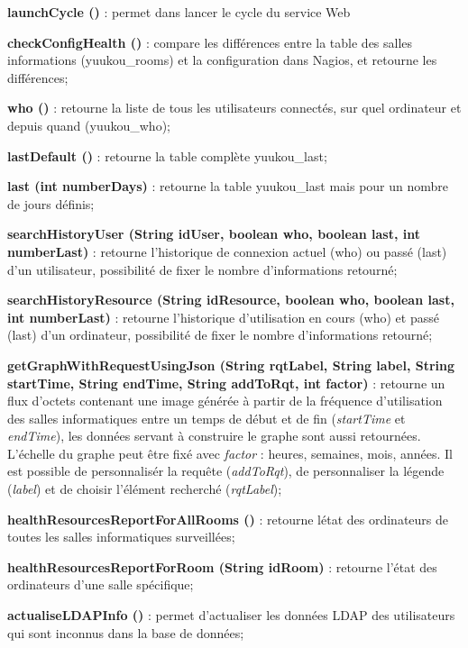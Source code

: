 \noindent\textbf{launchCycle ()} : permet dans lancer le cycle du service Web

\noindent\textbf{checkConfigHealth ()} : compare les diff\'erences entre la table des salles informations (\textsf{yuukou\_rooms}) et la configuration dans Nagios, et retourne les diff\'erences;

\noindent\textbf{who ()} : retourne la liste de tous les utilisateurs connect\'es, sur quel ordinateur et depuis quand (\textsf{yuukou\_who});

\noindent\textbf{lastDefault ()} : retourne la table compl\`ete \textsf{yuukou\_last};

\noindent\textbf{last (int numberDays)} : retourne la table \textsf{yuukou\_last} mais pour un nombre de jours d\'efinis;

\noindent\textbf{searchHistoryUser (String idUser, boolean who, boolean last, int numberLast)} : retourne l'historique de connexion actuel (who) ou pass\'e (last) d'un utilisateur, possibilit\'e de fixer le nombre d'informations retourn\'e;

\noindent\textbf{searchHistoryResource (String idResource, boolean who, boolean last, int numberLast)} : retourne l'historique d'utilisation en cours (who) et pass\'e (last) d'un ordinateur, possibilit\'e de fixer le nombre d'informations retourn\'e;

\noindent\textbf{getGraphWithRequestUsingJson (String rqtLabel, String label, String startTime, String endTime, String addToRqt, int factor)} : retourne un flux d'octets contenant une image g\'en\'er\'ee \`a partir de la fr\'equence d'utilisation des salles informatiques entre un temps de d\'ebut et de fin (\textit{startTime} et \textit{endTime}), les donn\'ees servant \`a construire le graphe sont aussi retourn\'ees. L'\'echelle du graphe peut \^etre fix\'e avec \textit{factor} : heures, semaines, mois, ann\'ees.
Il est possible de personnalis\'er la requ\^ete (\textit{addToRqt}), de personnaliser la l\'egende (\textit{label}) et de choisir l'\'el\'ement recherch\'e (\textit{rqtLabel});

\noindent\textbf{healthResourcesReportForAllRooms ()} : retourne l\'etat des ordinateurs de toutes les salles informatiques surveill\'ees;

\noindent\textbf{healthResourcesReportForRoom (String idRoom)} : retourne l'\'etat des ordinateurs d'une salle sp\'ecifique;

\noindent\textbf{actualiseLDAPInfo ()} : permet d'actualiser les donn\'ees LDAP des utilisateurs qui sont inconnus dans la base de donn\'ees;

